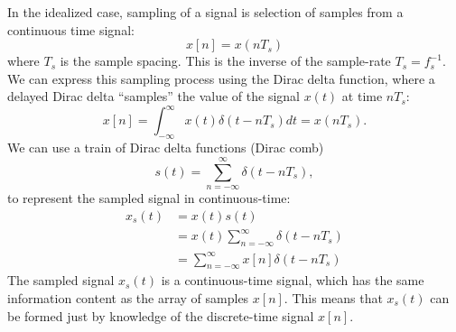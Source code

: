 In the idealized case, sampling of a signal is selection of samples from a continuous time signal:
\begin{equation}
x[n] = x(nT_s)
\end{equation}
where $T_s$ is the sample spacing. This is the inverse of the sample-rate $T_s = f_s^{-1}$.  We can express this sampling process using the Dirac delta function, where a delayed Dirac delta ``samples'' the value of the signal $x(t)$ at time $nT_s$:
\begin{equation}
x[n] = \int_{-\infty}^{\infty}x(t)\delta(t-nT_s)dt = x(nT_s).
\end{equation}
We can use a train of Dirac delta functions (Dirac comb) 
\begin{equation}
s(t) = \sum_{n=-\infty}^{\infty}\delta(t-nT_s),
\end{equation}
to represent the sampled signal in continuous-time:
\begin{align}
x_s(t) &= x(t) s(t) \\
       &= x(t) \sum_{n=-\infty}^{\infty} \delta(t-nT_s) \\
       &= \sum_{n=-\infty}^{\infty} x[n]\delta(t-nT_s)
\end{align}
The sampled signal $x_s(t)$ is a continuous-time signal, which has the same information content as the array of samples $x[n]$. This means that $x_s(t)$ can be formed just by knowledge of the discrete-time signal $x[n]$.

